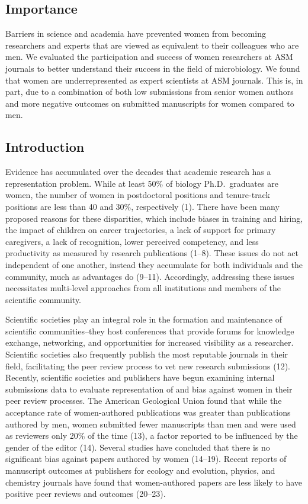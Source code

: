 \documentclass[11pt,]{article}
\begin{document}
\subsection{Importance}\label{importance}

Barriers in science and academia have prevented women from becoming
researchers and experts that are viewed as equivalent to their
colleagues who are men. We evaluated the participation and success of
women researchers at ASM journals to better understand their success in
the field of microbiology. We found that women are underrepresented as
expert scientists at ASM journals. This is, in part, due to a
combination of both low submissions from senior women authors and more
negative outcomes on submitted manuscripts for women compared to men.

\subsection{Introduction}\label{introduction}

Evidence has accumulated over the decades that academic research has a
representation problem. While at least 50\% of biology Ph.D.~graduates
are women, the number of women in postdoctoral positions and
tenure-track positions are less than 40 and 30\%, respectively (1).
There have been many proposed reasons for these disparities, which
include biases in training and hiring, the impact of children on career
trajectories, a lack of support for primary caregivers, a lack of
recognition, lower perceived competency, and less productivity as
measured by research publications (1--8). These issues do not act
independent of one another, instead they accumulate for both individuals
and the community, much as advantages do (9--11). Accordingly,
addressing these issues necessitates multi-level approaches from all
institutions and members of the scientific community.

Scientific societies play an integral role in the formation and
maintenance of scientific communities--they host conferences that
provide forums for knowledge exchange, networking, and opportunities for
increased visibility as a researcher. Scientific societies also
frequently publish the most reputable journals in their field,
facilitating the peer review process to vet new research submissions
(12). Recently, scientific societies and publishers have begun examining
internal submissions data to evaluate representation of and bias against
women in their peer review processes. The American Geological Union
found that while the acceptance rate of women-authored publications was
greater than publications authored by men, women submitted fewer
manuscripts than men and were used as reviewers only 20\% of the time
(13), a factor reported to be influenced by the gender of the editor
(14). Several studies have concluded that there is no significant bias
against papers authored by women (14--19). Recent reports of manuscript
outcomes at publishers for ecology and evolution, physics, and chemistry
journals have found that women-authored papers are less likely to have
positive peer reviews and outcomes (20--23).
\end{document}
